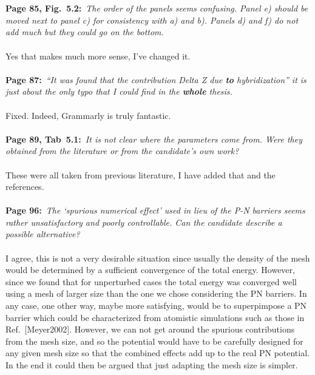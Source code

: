 \documentclass[a4, UTF8]{article}
\begin{document}
\\\\
{\bf Page 85, Fig.~5.2:}~{\it The order of the panels seems confusing. Panel e) should be moved next to
panel c) for consistency with a) and b). Panels d) and f) do not add much but they could go on the
bottom.}
\\\\
Yes that makes much more sense, I've changed it.
\\\\
{\bf Page 87:}~{\it ``It was found that the contribution Delta Z due {\bf to} hybridization'' it is just about the only typo that I could find in the {\bf whole} thesis.}
\\\\
Fixed. Indeed, Grammarly is truly fantastic.
\\\\
{\bf Page 89, Tab~5.1:}~{\it It is not clear where the parameters come from. Were they obtained from the literature or from the candidate’s own work?}
\\\\
These were all taken from previous literature, I have added that and the references.
\\\\
{\bf Page 96:}~{\it The `spurious numerical effect' used in lieu of the P-N barriers seems rather
unsatisfactory and poorly controllable. Can the candidate describe a possible alternative?}
\\\\
I agree, this is not a very desirable situation since usually the density of the mesh would be determined by a sufficient convergence of the total energy. However, since we found that for unperturbed cases the total energy was converged well using a mesh of larger size than the one we chose considering the PN barriers.
In any case, one other way, maybe more satisfying, would be to superpimpose a PN barrier which could be characterized from atomistic simulations such as those in Ref.~[Meyer2002]. However, we can not get around the spurious contributions from the mesh size, and so the potential would have to be carefully designed for any given mesh size so that the combined effects add up to the real PN potential. In the end it could then be argued that just adapting the mesh size is simpler.
\end{document}

